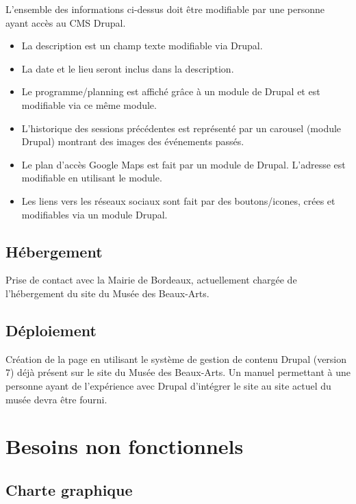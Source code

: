\documentclass[11pt]{report}
\begin{document}
\vspace{0.5cm}

L'ensemble des informations ci-dessus doit être modifiable par une personne
ayant accès au CMS Drupal. \\

\begin{itemize}
	\item La description est un champ texte modifiable via Drupal.
	\item La date et le lieu seront inclus dans la description.
	\item Le programme/planning est affiché grâce à un module de Drupal et est
	modifiable via ce même module.
	\item L'historique des sessions précédentes est représenté par un carousel
	(module Drupal) montrant des images des événements passés.
	\item Le plan d'accès Google Maps est fait par un module de Drupal.
	L'adresse est modifiable en utilisant le module.
	\item Les liens vers les réseaux sociaux sont fait par des boutons/icones,
	crées et modifiables via un module Drupal.
\end{itemize}

\subsection*{Hébergement}
Prise de contact avec la Mairie de Bordeaux, actuellement chargée de
l'hébergement du site du Musée des Beaux-Arts.

\subsection*{Déploiement}
Création de la page en utilisant le système de gestion de contenu Drupal
(version 7) déjà présent sur le site du Musée des Beaux-Arts.
Un manuel permettant à une personne ayant de l'expérience avec Drupal
d'intégrer le site au site actuel du musée devra être fourni.


\section{Besoins non fonctionnels}

\subsection*{Charte graphique}
\end{document}
